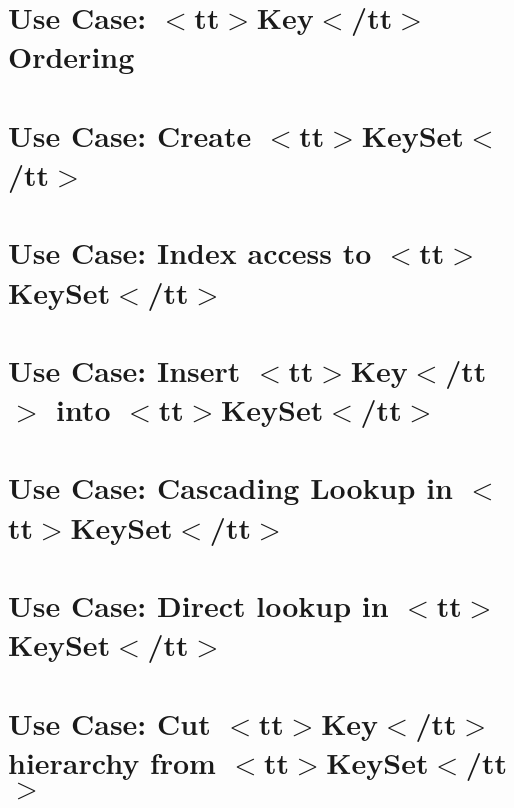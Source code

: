 \let\mypdfximage\pdfximage\def\pdfximage{\immediate\mypdfximage}\documentclass[twoside]{book}
\newcommand{\+}{\discretionary{\mbox{\scriptsize$\hookleftarrow$}}{}{}}
\begin{document}
\chapter{Use Case\+: $<$tt$>$Key$<$/tt$>$ Ordering}
\label{doc_usecases_core_UC_keyname_ordering_md}

\chapter{Use Case\+: Create $<$tt$>$Key\+Set$<$/tt$>$}
\label{doc_usecases_core_UC_keyset_create_md}

\chapter{Use Case\+: Index access to $<$tt$>$Key\+Set$<$/tt$>$}
\label{doc_usecases_core_UC_keyset_index_access_md}

\chapter{Use Case\+: Insert $<$tt$>$Key$<$/tt$>$ into $<$tt$>$Key\+Set$<$/tt$>$}
\label{doc_usecases_core_UC_keyset_insert_md}

\chapter{Use Case\+: Cascading Lookup in $<$tt$>$Key\+Set$<$/tt$>$}
\label{doc_usecases_core_UC_keyset_lookup_cascading_md}

\chapter{Use Case\+: Direct lookup in $<$tt$>$Key\+Set$<$/tt$>$}
\label{doc_usecases_core_UC_keyset_lookup_direct_md}

\chapter{Use Case\+: Cut $<$tt$>$Key$<$/tt$>$ hierarchy from $<$tt$>$Key\+Set$<$/tt$>$}
\label{doc_usecases_core_UC_keyset_lookup_hierarchy_md}

\end{document}
